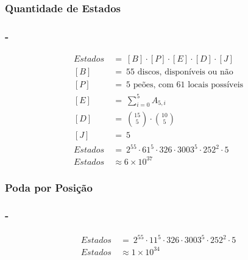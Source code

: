 \subsubsection{Quantidade de Estados}
\begin{frame}[fragile]
	\frametitle{\subsecname - \subsubsecname}

\begin{equation*}
\begin{split}
	Estados\ &=\ [B]\cdot[P]\cdot[E]\cdot[D]\cdot[J]\\
	[B]\ &=\ 55\text{ discos, disponíveis ou não}\\
	[P]\ &=\ 5\text{ peões, com }61\text{ locais possíveis}\\
	[E]\ &=\ \displaystyle\sum_{i=0}^{5} A_{5,i}\\
	[D]\ &=\ \binom{15}{5}\cdot\binom{10}{5}\\
	[J]\ &=\ 5\\
	Estados\ &=\ 2^{55}\cdot61^{5}\cdot326\cdot3003^{5}\cdot252^{2}\cdot5\\
	Estados\ &\approx 6\times 10^{37}
\end{split}
\end{equation*}
\end{frame}

\subsubsection{Poda por Posição}
\begin{frame}[fragile]
	\frametitle{\subsecname - \subsubsecname}
\begin{equation*}
\begin{split}
	Estados\ &=\ 2^{55}\cdot11^{5}\cdot326\cdot3003^{5}\cdot252^{2}\cdot5\\
	Estados\ &\approx 1\times 10^{34}
\end{split}
\end{equation*}
\end{frame}


